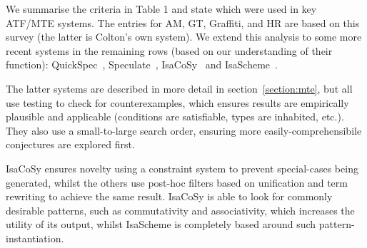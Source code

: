 %
%
%
%


We summarise the criteria in Table 1 and state which were used in key
ATF/MTE systems. The entries for AM, GT, Graffiti, \Bagai{} and HR are based
on this survey (the latter is Colton's own system). We extend this analysis to
some more recent systems in the remaining rows (based on our understanding of
their function): QuickSpec~\cite{QuickSpec},
Speculate~\cite{braquehais2017speculate},
IsaCoSy~\cite{Johansson.Dixon.Bundy:conjecture-generation}
and IsaScheme~\cite{MontanoRivas2011}.

The latter systems are described in more detail in section~\ref{section:mte},
but all use testing to check for counterexamples, which ensures results are
empirically plausible and applicable (conditions are satisfiable, types are
inhabited, etc.). They also use a small-to-large search order, ensuring more
easily-comprehensibile conjectures are explored first.

IsaCoSy ensures novelty using a constraint system to prevent special-cases being
generated, whilst the others use post-hoc filters based on unification and term
rewriting to achieve the same result. IsaCoSy is able to look for commonly
desirable patterns, such as commutativity and associativity, which increases the
utility of its output, whilst IsaScheme is completely based around such
pattern-instantiation.

